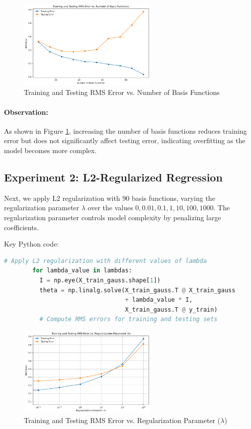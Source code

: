\documentclass{article}
\begin{document}
	\begin{figure}[!h]
		\centering
		\includegraphics[width=0.6\textwidth]{images/q4_par4a.png}
		\caption{Training and Testing RMS Error vs. Number of Basis Functions}
		\label{fig:basis_functions_plot}
	\end{figure}
	
	\paragraph{Observation:}
	As shown in Figure \ref{fig:basis_functions_plot}, increasing the number of basis functions reduces training error but does not significantly affect testing error, indicating overfitting as the model becomes more complex.
	
	\subsection*{Experiment 2: L2-Regularized Regression}
	Next, we apply L2 regularization with 90 basis functions, varying the regularization parameter \(\lambda\) over the values \(0, 0.01, 0.1, 1, 10, 100, 1000\). The regularization parameter controls model complexity by penalizing large coefficients.
	
	Key Python code:
	\begin{lstlisting}[language=Python]
		# Apply L2 regularization with different values of lambda
		for lambda_value in lambdas:
		  I = np.eye(X_train_gauss.shape[1])
		  theta = np.linalg.solve(X_train_gauss.T @ X_train_gauss 
		                          + lambda_value * I, 
		                          X_train_gauss.T @ y_train)
		  # Compute RMS errors for training and testing sets
	\end{lstlisting}
	
	\begin{figure}[!h]
		\centering
		\includegraphics[width=0.6\textwidth]{images/q4_par4b.png}
		\caption{Training and Testing RMS Error vs. Regularization Parameter (\(\lambda\))}
		\label{fig:regularization_plot}
	\end{figure}
	
\end{document}
